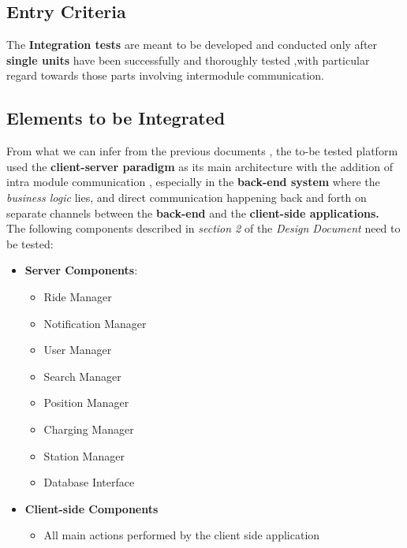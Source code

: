 \subsection{Entry Criteria}
The \textbf{Integration tests} are meant to be developed and conducted only after \textbf{single units} have been successfully and thoroughly tested ,with particular regard towards those parts involving intermodule communication.\\


\subsection{Elements to be Integrated}
From what we can infer from the previous documents , the to-be tested platform
used the \textbf{client-server paradigm} as its main architecture with the addition of intra module communication , especially in the \textbf{back-end system} where the \textit{business logic} lies, and direct communication happening back and forth on separate channels between the \textbf{back-end} and the \textbf{client-side applications.} \\
The following components described in \emph{section 2} of the \emph{Design Document} need to be tested:
\begin{itemize}
\item \textbf{Server Components}:
\begin{itemize}
\item Ride Manager
\item Notification Manager
\item User Manager
\item Search Manager
\item Position Manager
\item Charging Manager
\item Station Manager
\item Database Interface
\end{itemize}
\item \textbf{Client-side Components}
\begin{itemize}
\item All main actions performed by the client side application
\end{itemize}
\end{itemize}

